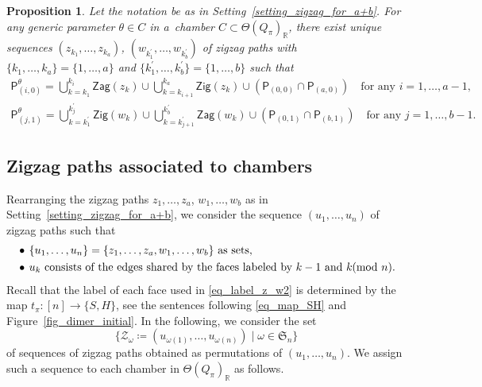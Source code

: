 \documentclass[pdftex]{sigma}
\numberwithin{equation}{section}
\newtheorem{Proposition}[Theorem]{Proposition}
\theoremstyle{definition}
\newcommand{\RR}{\mathbb{R}}
\newcommand{\calZ}{\mathcal{Z}}
\newcommand{\fkS}{\mathfrak{S}}
\newcommand{\sfP}{\mathsf{P}}
\newcommand{\Zig}{\mathsf{Zig}}
\newcommand{\Zag}{\mathsf{Zag}}
\newcommand{\perm}{\pi}
\newcommand{\permII}{\omega}
\begin{document}
\begin{Proposition}\label{prop_bPM_zzsequence}\samepage
Let the notation be as in Setting~{\rm \ref{setting_zigzag_for_a+b}}.
For any generic parameter $\theta\in C$ in a~chamber $C\subset\Theta(Q_\perm)_\RR$,
there exist unique sequences $(z_{k_1},\dots, z_{k_a})$, $(w_{k^\prime_1}, \dots, w_{k^\prime_b})$ of zigzag paths
with $\{k_1,\dots, k_a\}=\{1,\dots,a\}$ and $\{k^\prime_1,\dots, k^\prime_b\}=\{1,\dots, b\}$ such that
\begin{gather}
\label{eq_bPM_from_zz1}
\sfP^\theta_{(i,0)}=\bigcup_{k=k_1}^{k_i}\Zag(z_k)\cup\bigcup_{k=k_{i+1}}^{k_a}\Zig(z_k) \cup (\sfP_{(0,0)}\cap\sfP_{(a,0)} ) \quad \text{for any $i=1,\dots, a-1$},
\\
\label{eq_bPM_from_zz2}
\sfP^\theta_{(j,1)}=\bigcup_{k=k^\prime_1}^{k^\prime_j}\Zig(w_k)\cup\bigcup_{k=k^\prime_{j+1}}^{k^\prime_b}\Zag(w_k) \cup (\sfP_{(0,1)}\cap\sfP_{(b,1)} ) \quad \text{for any $j=1,\dots, b-1$}.
\end{gather}
\end{Proposition}

\subsection{Zigzag paths associated to chambers}
\label{subsec_zigzag_ass_chamber}

Rearranging the zigzag paths $z_1, \dots, z_a$, $w_1, \dots, w_b$ as in Setting~\ref{setting_zigzag_for_a+b},
we consider the sequence $(u_1, \dots, u_n)$ of zigzag paths such that
\begin{align}
\label{eq_label_z_w}
&\bullet\, \text{$\{u_1, \dots, u_n\}=\{z_1,\dots, z_a, w_1,\dots, w_b\}$ as sets,} \\
\label{eq_label_z_w2}
&\bullet\, \text{$u_k$ consists of the edges shared by the faces labeled by $k-1$ and $k$ \hspace{-8pt}$\pmod n$.}
\end{align}
Recall that the label of each face used in \eqref{eq_label_z_w2} is determined by the map $t_\perm\colon [n]\rightarrow \{S, H\}$,
see the sentences following \eqref{eq_map_SH} and Figure~\ref{fig_dimer_initial}.
In the following, we consider the set
\[
\{\calZ_\permII\coloneqq (u_{\permII(1)}, \dots, u_{\permII(n)}) \mid \permII\in\fkS_n\}
\]
of sequences of zigzag paths obtained as permutations of $(u_1, \dots, u_n)$.
We assign such a sequence to each chamber in $\Theta(Q_\perm)_\RR$ as follows.
\end{document}
